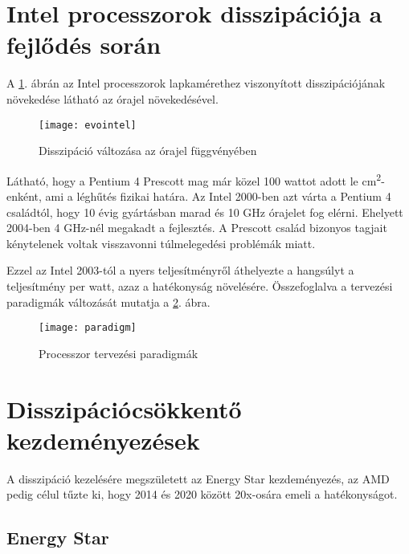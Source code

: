 \section{Intel processzorok disszipációja a fejlődés során}
A \ref{fig:evointel}. ábrán az Intel processzorok lapkamérethez viszonyított disszipációjának növekedése látható az órajel növekedésével.
\begin{figure}[H]
    \texttt{[image: evointel]}
    \centering
    \caption{Disszipáció változása az órajel függvényében}
    \label{fig:evointel}
\end{figure}
Látható, hogy a Pentium 4 Prescott mag már közel 100 wattot adott le cm\textsuperscript{2}-enként, ami a léghűtés fizikai határa.
Az Intel 2000-ben azt várta a Pentium 4 családtól, hogy 10 évig gyártásban marad és 10 GHz órajelet fog elérni.
Ehelyett 2004-ben 4 GHz-nél megakadt a fejlesztés.
A Prescott család bizonyos tagjait kénytelenek voltak visszavonni túlmelegedési problémák miatt.

Ezzel az Intel 2003-tól a nyers teljesítményről áthelyezte a hangsúlyt a teljesítmény per watt, azaz a hatékonyság növelésére.
Összefoglalva a tervezési paradigmák változását mutatja a \ref{fig:paradigm}. ábra.
\begin{figure}[H]
    \texttt{[image: paradigm]}
    \centering
    \caption{Processzor tervezési paradigmák}
    \label{fig:paradigm}
\end{figure}

\section{Disszipációcsökkentő kezdeményezések}
A disszipáció kezelésére megszületett az Energy Star kezdeményezés, az AMD pedig célul tűzte ki, hogy 2014 és 2020 között 20x-osára emeli a hatékonyságot.

\subsection{Energy Star}
